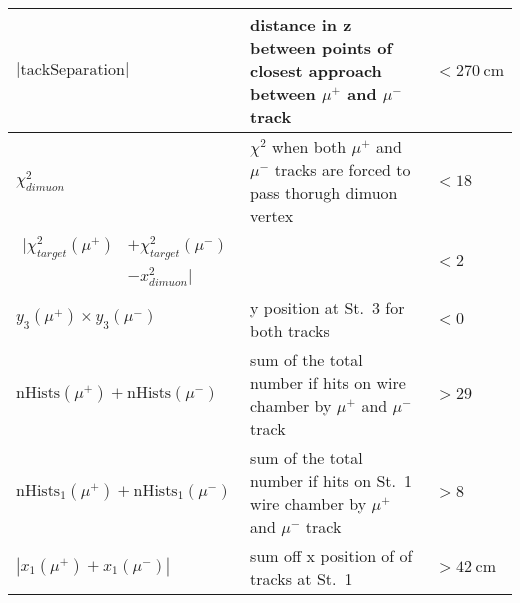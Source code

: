 \documentclass[../main.tex]{subfiles}
\begin{document}
\begin{table}[ht!]
\begin{tabular}{|m{4.5cm}|m{7cm}|m{3cm}|}
		$|\textrm{tackSeparation}|$                                                                         & distance in z between points   of  closest approach between $\mu^+$   and $\mu^-$ track  & $<\SI{270}{\cm}$               \\ \hline
		$\chi^2_{dimuon}$                                                                                   & $\chi^2$ when both $\mu^+$ and   $\mu^-$ tracks are forced to pass thorugh dimuon vertex & $<18$                          \\ \hline
		$\begin{aligned} |\chi^2_{target}(\mu^+) &+ \chi^2_{target}(\mu^-)\\& -x^2_{dimuon}| \end{aligned}$ &                                                                                          & $<2$                           \\ \hline
		$y_3(\mu^+) \times y_3(\mu^-)$                                                                      & y position at St.\ 3 for both tracks                                                     & $<0$                           \\ \hline
		$\textrm{nHists}(\mu^+)+\textrm{nHists}(\mu^-)$                                                     & sum of the total number if hits   on wire chamber by $\mu^+$ and $\mu^-$ track           & $>29$                          \\ \hline
		$\textrm{nHists}_1(\mu^+)+\textrm{nHists}_1(\mu^-)$                                                 & sum of the total number if hits   on St.\ 1 wire chamber by $\mu^+$ and $\mu^-$ track    & $>8$                           \\ \hline
		$|x_1(\mu^+) + x_1(\mu^-)|$                                                                         & sum off x position of of tracks   at St.\ 1                                              & $>\SI{42}{\cm}$                \\ \hline
	\end{tabular}
\end{table}
\end{document}
